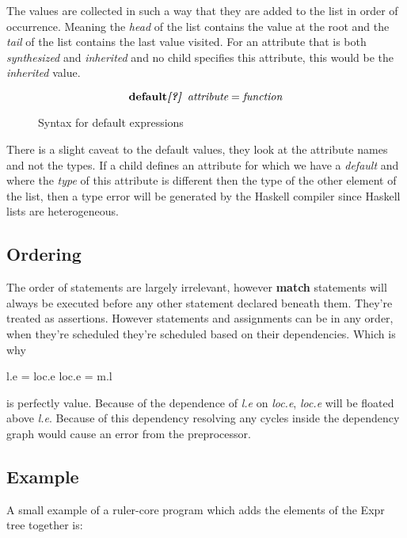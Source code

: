 The values are collected in such a way that they are added to the list in order of occurrence. Meaning the \emph{head} of the list contains the value at the root and the \emph{tail} of the list contains the last value visited. For an attribute that is both \emph{synthesized} and \emph{inherited} and no child specifies this attribute, this would be the \emph{inherited} value.

\begin{figure}[h!]
\[
\textbf{default\textit{[?]}} \hspace{5pt} \emph{attribute} = \emph{function}
\]
\caption{Syntax for default expressions}
\label{default:syntax}
\end{figure}

There is a slight caveat to the default values, they look at the attribute names and not the types. If a child defines an attribute for which we have a \emph{default} and where the \emph{type} of this attribute is different then the type of the other element of the list, then a type error will be generated by the Haskell compiler since Haskell lists are heterogeneous.
\subsection{Ordering}
The order of statements are largely irrelevant, however \textbf{match} statements will always be executed before any other statement declared beneath them. They're treated as assertions. However statements and assignments can be in any order, when they're scheduled they're scheduled based on their dependencies. Which is why

\begin{code}
l.e = loc.e
loc.e = m.l
\end{code}

is perfectly value. Because of the dependence of \emph{l.e} on \emph{loc.e}, \emph{loc.e} will be floated above \emph{l.e}. Because of this dependency resolving any cycles inside the dependency graph would cause an error from the preprocessor.

\subsection{Example}
A small example of a ruler-core program which adds the elements of the Expr tree together is:

